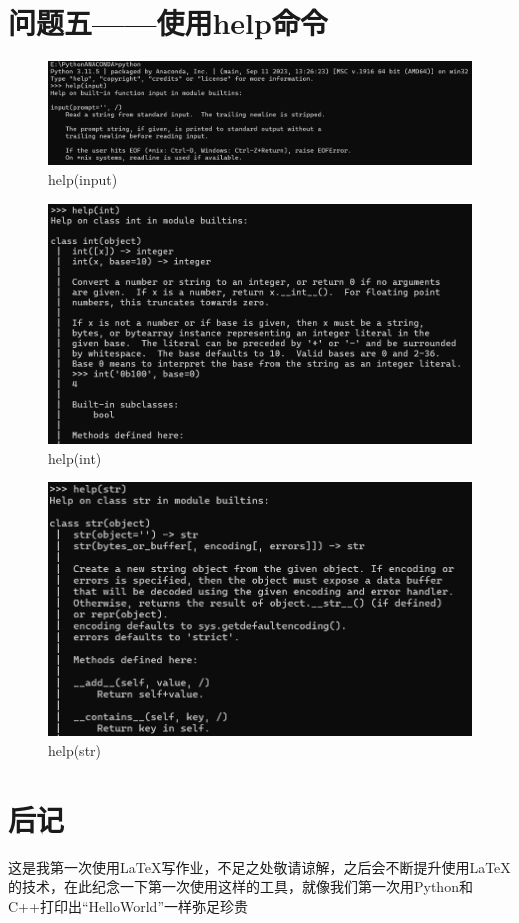 \documentclass[10pt]{article}
\begin{document}
\section{问题五——使用help命令}
	\begin{figure}[H]
		\centering
		\includegraphics[scale=0.45]{help_input}
		\caption{help(input)}
	\end{figure}
	\begin{figure}[H]
		\centering
		\includegraphics[scale=0.45]{help_int}
		\caption{help(int)}
	\end{figure}
	\begin{figure}[H]
		\centering
		\includegraphics[scale=0.45]{help_str}
		\caption{help(str)}
	\end{figure}




\section{后记}
	这是我第一次使用LaTeX写作业，不足之处敬请谅解，之后会不断提升使用LaTeX的技术，在此纪念一下第一次使用这样的工具，就像我们第一次用Python和C++打印出“HelloWorld”一样弥足珍贵
	
	
\end{document}
